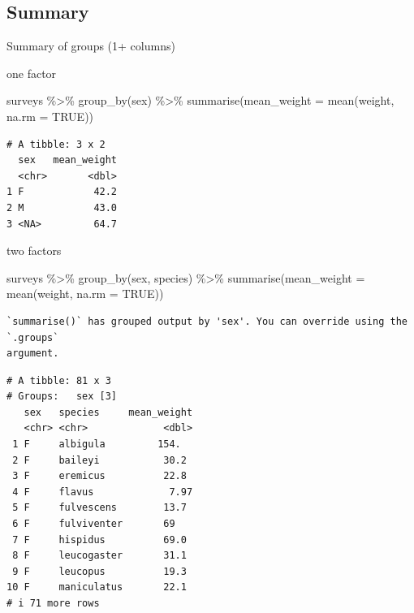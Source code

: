 \documentclass[
  letterpaper,
  DIV=11,
  numbers=noendperiod]{scrreprt}
\newenvironment{Shaded}{\begin{snugshade}}{\end{snugshade}}
\newcommand{\AttributeTok}[1]{\textcolor[rgb]{0.40,0.45,0.13}{#1}}
\newcommand{\ConstantTok}[1]{\textcolor[rgb]{0.56,0.35,0.01}{#1}}
\newcommand{\FunctionTok}[1]{\textcolor[rgb]{0.28,0.35,0.67}{#1}}
\newcommand{\NormalTok}[1]{\textcolor[rgb]{0.00,0.23,0.31}{#1}}
\newcommand{\SpecialCharTok}[1]{\textcolor[rgb]{0.37,0.37,0.37}{#1}}
\begin{document}
\subsection{Summary}\label{summary}

Summary of groups (1+ columns)

one factor

\begin{Shaded}
\begin{Highlighting}[]
\NormalTok{surveys }\SpecialCharTok{\%\textgreater{}\%}
    \FunctionTok{group\_by}\NormalTok{(sex) }\SpecialCharTok{\%\textgreater{}\%}
    \FunctionTok{summarise}\NormalTok{(}\AttributeTok{mean\_weight =} \FunctionTok{mean}\NormalTok{(weight, }\AttributeTok{na.rm =} \ConstantTok{TRUE}\NormalTok{))}
\end{Highlighting}
\end{Shaded}

\begin{verbatim}
# A tibble: 3 x 2
  sex   mean_weight
  <chr>       <dbl>
1 F            42.2
2 M            43.0
3 <NA>         64.7
\end{verbatim}

two factors

\begin{Shaded}
\begin{Highlighting}[]
\NormalTok{surveys }\SpecialCharTok{\%\textgreater{}\%}
    \FunctionTok{group\_by}\NormalTok{(sex, species) }\SpecialCharTok{\%\textgreater{}\%}
    \FunctionTok{summarise}\NormalTok{(}\AttributeTok{mean\_weight =} \FunctionTok{mean}\NormalTok{(weight, }\AttributeTok{na.rm =} \ConstantTok{TRUE}\NormalTok{))}
\end{Highlighting}
\end{Shaded}

\begin{verbatim}
`summarise()` has grouped output by 'sex'. You can override using the `.groups`
argument.
\end{verbatim}

\begin{verbatim}
# A tibble: 81 x 3
# Groups:   sex [3]
   sex   species     mean_weight
   <chr> <chr>             <dbl>
 1 F     albigula         154.  
 2 F     baileyi           30.2 
 3 F     eremicus          22.8 
 4 F     flavus             7.97
 5 F     fulvescens        13.7 
 6 F     fulviventer       69   
 7 F     hispidus          69.0 
 8 F     leucogaster       31.1 
 9 F     leucopus          19.3 
10 F     maniculatus       22.1 
# i 71 more rows
\end{verbatim}
\end{document}
